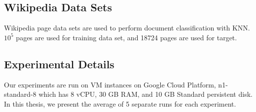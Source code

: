 \subsection{Wikipedia Data Sets}
 \label{sec:concept_dataset}
 Wikipedia page data sets are used to perform document classification with KNN. 
 \(10^5\) pages are used for training data set, and 18724 pages are used for target.

 \subsection{Experimental Details}
 \label{sec:concept_expdetail}
 Our experiments are run on VM instances on Google Cloud Platform, 
 n1-standard-8 which has 8 vCPU, 30 GB RAM, and 10 GB Standard persistent disk.
 In this thesis, we present the average of 5 separate runs for each experiment.